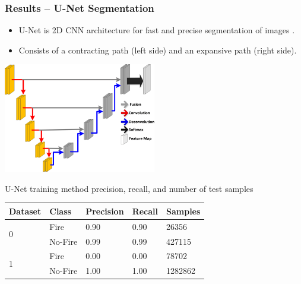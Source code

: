 \documentclass{beamer}
\begin{document}
\begin{frame}
  \frametitle{Results -- U-Net Segmentation}
 \scriptsize
 \begin{itemize}
 \item U-Net is 2D CNN architecture for fast and precise segmentation of images 
\cite{RonnebergerFB15}.
 \item  Consists of a contracting path (left side) and an expansive path (right 
side).
 \end{itemize}

\centering
\includegraphics[width=0.5\textwidth]{figs/U-net-architecture.png}


\begin{table}
\centering

   \scriptsize U-Net training method precision, recall, and number of 
test samples
   \\
    \label{tbl:dnn_results}
\begin{tabular}{ |l|l|l|l|l| }
 \hline
Dataset & Class & Precision & Recall & Samples\\ \hline
\multirow{2}{*}{0} 
 & Fire & 0.90 & 0.90  & 26356 \\
 & No-Fire & 0.99 & 0.99 & 427115 \\ 
 \hline

\multirow{2}{*}{1} 
& Fire & 0.00 & 0.00 & 78702 \\
 & No-Fire & 1.00 & 1.00 & 1282862 \\
\hline
\end{tabular}
\end{table}

\end{frame}  
\end{document}
